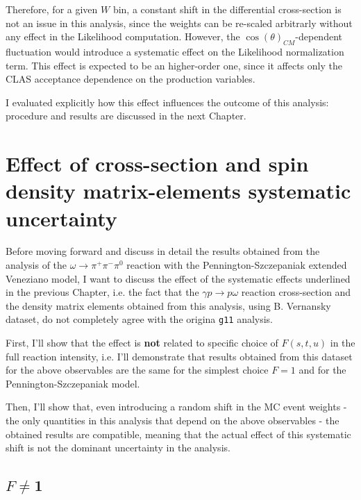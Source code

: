 \documentclass[a4paper,10pt]{report}
\newcommand{\decay}{$\omega \rightarrow \pi^+ \pi^- \pi^0$ }
\newcommand{\production}{$\gamma p \rightarrow p \omega$ }
\begin{document}
Therefore, for a given $W$ bin, a constant shift in the differential cross-section is not an issue in this analysis, since the weights can be re-scaled arbitrarly without any effect in the Likelihood computation. However, the $\cos(\theta)_{CM}$-dependent fluctuation would introduce a systematic effect on the Likelihood normalization term. This effect is expected to be an higher-order one, since it affects only the CLAS acceptance dependence on the production variables.

I evaluated explicitly how this effect influences the outcome of this analysis: procedure and results are discussed in the next Chapter.



\chapter{Effect of cross-section and spin density matrix-elements systematic uncertainty}

Before moving forward and discuss in detail the results obtained from the analysis of the \decay reaction with the Pennington-Szczepaniak extended Veneziano model, I want to discuss the effect of the systematic effects underlined in the previous Chapter,
i.e. the fact that the \production reaction cross-section and the density matrix elements obtained from this analysis, using B. Vernansky dataset, do not completely agree with the origina \texttt{g11} analysis.

First, I'll show that the effect is \textbf{not} related to specific choice of $F(s,t,u)$ in the full reaction intensity, i.e. I'll demonstrate that results obtained from this dataset for the above observables are the same for the simplest choice $F=1$ and for the 
Pennington-Szczepaniak model.

Then, I'll show that, even introducing a random shift in the MC event weights - the only quantities in this analysis that depend on the above observables - the obtained results are compatible, meaning that the actual effect of this systematic shift is not the dominant 
uncertainty in the analysis.
 


\section{$F\neq$1}
\end{document}
